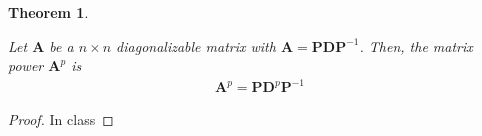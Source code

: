 \documentclass[
]{book}
\newtheorem{theorem}{Theorem}[chapter]
\theoremstyle{definition}
\theoremstyle{definition}
\theoremstyle{definition}
\theoremstyle{remark}
\begin{document}
\begin{theorem}
\protect\hypertarget{thm:unlabeled-div-181}{}\label{thm:unlabeled-div-181}

Let \(\mathbf{A}\) be a \(n \times n\) diagonalizable matrix with \(\mathbf{A} = \mathbf{P} \mathbf{D} \mathbf{P}^{-1}\). Then, the matrix power \(\mathbf{A}^p\) is
\[
\begin{aligned}
\mathbf{A}^p = \mathbf{P} \mathbf{D}^p \mathbf{P}^{-1}
\end{aligned}
\]

\end{theorem}

\begin{proof}

In class

\end{proof}
\end{document}
